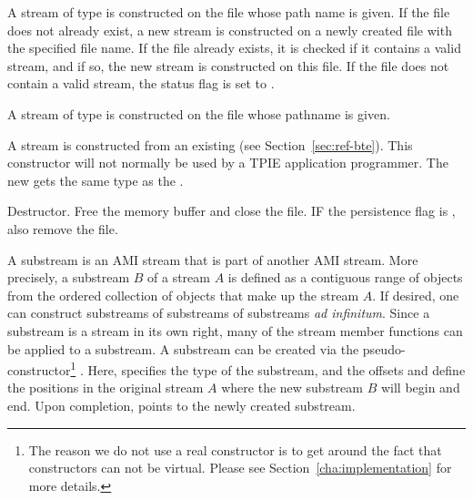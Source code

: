      {A stream of type
     is constructed on the file whose path
    name is given. If the file does not already exist, a new stream is
    constructed on a newly created file with the specified file name. If
    the file already exists, it is checked if it contains a valid stream,
    and if so, the new stream is constructed on this file. If the file does
    not contain a valid stream, the status flag is set to
    .}

     {A
    stream of type  is constructed on the file whose pathname is
    given.}

     {A stream is constructed from
    an existing  (see Section~\ref{sec:ref-bte}). This
    constructor will not normally be used by a TPIE application
    programmer. The new  gets the same type as the
    .}

     {Destructor. Free the memory
    buffer and close the file. IF the persistence flag is
    , also remove the file.}

    {A substream is an AMI stream that is part of another AMI stream. More
    precisely, a substream $B$ of a stream $A$ is defined as a contiguous
    range of objects from the ordered collection of objects that make up
    the stream $A$.  If desired, one can construct substreams of substreams
    of substreams {\em ad infinitum}. Since a substream is a stream in its
    own right, many of the stream member functions can be applied to a
    substream. A substream can be created via the
    pseudo-constructor\footnote{The reason we do not use a real constructor
    is to get around the fact that constructors can not be virtual.  Please
    see Section~\ref{cha:implementation} for more details.}
    . Here,  specifies the type of the
    substream, and the offsets  and 
    define the positions in the original stream $A$ where the new substream
    $B$ will begin and end. Upon completion,  points
    to the newly created substream.}
  \etabb

